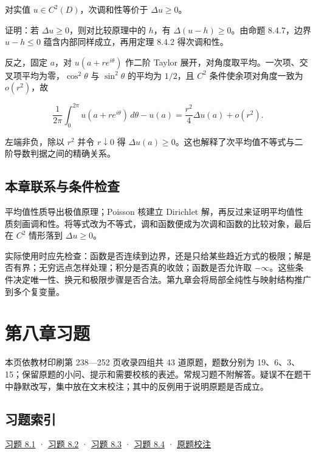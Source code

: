 \documentclass[11pt,a4paper]{article}
\begin{document}
对实值 \(u\in C^2(D)\)，次调和性等价于 \(\Delta u\ge0\)。

证明：若 \(\Delta u\ge0\)，则对比较原理中的 \(h\)，有
\(\Delta(u-h)\ge0\)。由命题 8.4.7，边界 \(u-h\le0\)
蕴含内部同样成立，再用定理 8.4.2 得次调和性。

反之，固定 \(a\)，对 \(u(a+re^{i\theta})\) 作二阶 Taylor
展开，对角度取平均。一次项、交叉项平均为零，\(\cos^2\theta\) 与
\(\sin^2\theta\) 的平均为 \(1/2\)，且 \(C^2\) 条件使余项对角度一致为
\(o(r^2)\)，故

\[
\frac1{2\pi}\int_0^{2\pi}u(a+re^{i\theta})\,d\theta-u(a)
=\frac{r^2}{4}\Delta u(a)+o(r^2).\tag{8.4.H}
\]

左端非负，除以 \(r^2\) 并令 \(r\downarrow0\) 得
\(\Delta u(a)\ge0\)。这也解释了次平均值不等式与二阶导数判据之间的精确关系。

\subsection*{本章联系与条件检查}\label{ch08-s4-heading-10}

平均值性质导出极值原理；Poisson 核建立 Dirichlet
解，再反过来证明平均值性质刻画调和性。将等式改为不等式，调和函数便成为次调和函数的比较对象，最后在
\(C^2\) 情形落到 \(\Delta u\ge0\)。

实际使用时应先检查：函数是否连续到边界，还是只给某些趋近方式的极限；解是否有界；无穷远点怎样处理；积分是否真的收敛；函数是否允许取
\(-\infty\)。这些条件决定唯一性、换元和极限步骤是否合法。第九章会将局部全纯性与映射结构推广到多个复变量。

\clearpage\section*{第八章习题}
本页依教材印刷第 238---252 页收录四组共 43 道原题，题数分别为
19、6、3、15；保留原题的小问、提示和需要校核的表述。常规习题不附解答。疑误不在题干中静默改写，集中放在文末校注；其中的反例用于说明原题是否成立。

\subsection*{习题索引}\label{ch08-practice-heading-1}

\hyperref[ch08-practice-heading-2]{习题 8.1} · \hyperref[ch08-practice-heading-3]{习题 8.2} ·
\hyperref[ch08-practice-heading-4]{习题 8.3} · \hyperref[ch08-practice-heading-5]{习题 8.4} ·
\hyperref[ch08-practice-heading-6]{原题校注}
\end{document}
